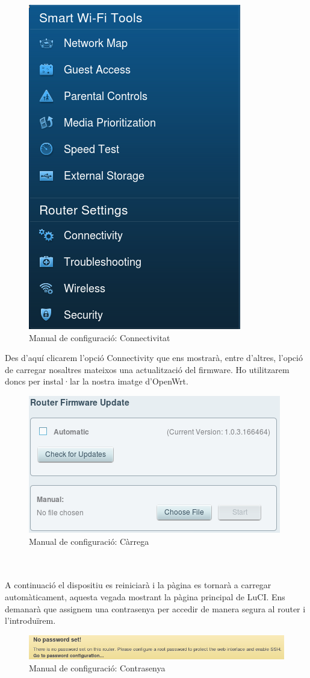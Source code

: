 \documentclass[11pt]{article}
\begin{document}
\begin{figure}[h]
		\centering
		\includegraphics[scale=0.4]{man1}
		\caption{Manual de configuració: Connectivitat}
	\end{figure}
	
Des d'aquí clicarem l'opció Connectivity que ens mostrarà, entre d'altres, l'opció de carregar nosaltres mateixos una actualització del firmware. Ho utilitzarem doncs per instal·lar la nostra imatge d'OpenWrt.
\begin{figure}[h]
		\centering
		\includegraphics[scale=0.5]{man2}
		\caption{Manual de configuració: Càrrega}
	\end{figure}
\\
\\
	A continuació el dispositiu es reiniciarà i la pàgina es tornarà a carregar automàticament, aquesta vegada mostrant la pàgina principal de LuCI. Ens demanarà que assignem una contrasenya per accedir de manera segura al router i l'introduïrem.
\begin{figure}[h]
		\centering
		\includegraphics[scale=0.5]{man3}
		\caption{Manual de configuració: Contrasenya}
	\end{figure}
\end{document}
